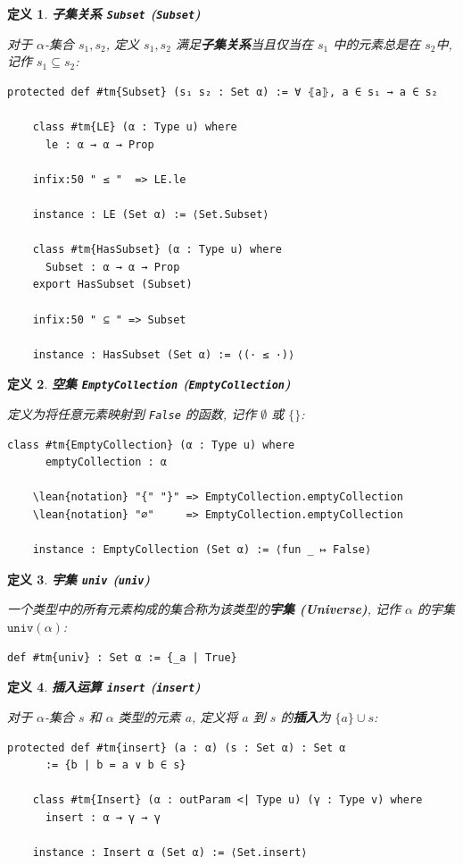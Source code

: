 \documentclass[UTF8]{ctexart}
\DeclareMathOperator{\0}{\mathbf{0}}                    %
\newcommand{\<}{\langle}
\renewcommand{\>}{\rangle}                              %
\newenvironment{dfn_box}{
    \begin{tcolorbox}[enhanced, colback=dfn_green2, boxrule=0pt, frame hidden,
        borderline west={0.7mm}{0.1mm}{dfn_green1},breakable]
    }
    {\end{tcolorbox}}
\theoremstyle{MyStyle} %
\newtheorem{definition}{定义}[subsection]
\newenvironment{dfn}[2]
{
    \begin{dfn_box}
        \begin{definition}
            \textbf{#1
                \ifx\relax#2\relax\else %
                    (#2) %
                \fi}
            \newline
}
{
        \end{definition}
    \end{dfn_box}
}
\newcommand*{\lean}[1]{\texttt{\color{blue}#1}}
\begin{document}
        \begin{dfn}
            {子集关系}
            {\texttt{Subset}}
            对于 $\alpha$-集合 $s_1, s_2$, 定义 $s_1, s_2$ 满足\textbf{子集关系}当且仅当在 $s_1$ 中的元素总是在 $s_2$中, 记作 $s_1\subseteq s_2$:
            \begin{lstlisting}[style=lean]
    protected def #tm{Subset} (s₁ s₂ : Set α) := ∀ ⦃a⦄, a ∈ s₁ → a ∈ s₂

    class #tm{LE} (α : Type u) where
      le : α → α → Prop

    infix:50 " ≤ "  => LE.le

    instance : LE (Set α) := ⟨Set.Subset⟩

    class #tm{HasSubset} (α : Type u) where
      Subset : α → α → Prop
    export HasSubset (Subset)
    
    infix:50 " ⊆ " => Subset

    instance : HasSubset (Set α) := ⟨(· ≤ ·)⟩
            \end{lstlisting}
        \end{dfn}

        \begin{dfn}
            {空集}
            {\texttt{EmptyCollection}}
            定义为将任意元素映射到 \texttt{False} 的函数, 记作 $\emptyset$ 或 $\{\}$: 
            \begin{lstlisting}[style=lean]
    class #tm{EmptyCollection} (α : Type u) where
      emptyCollection : α

    \lean{notation} "{" "}" => EmptyCollection.emptyCollection
    \lean{notation} "∅"     => EmptyCollection.emptyCollection

    instance : EmptyCollection (Set α) := ⟨fun _ ↦ False⟩
            \end{lstlisting}
        \end{dfn}

        \begin{dfn}
            {宇集}
            {\texttt{univ}}
            一个类型中的所有元素构成的集合称为该类型的\textbf{宇集 (Universe)}, 记作 $\alpha$ 的宇集 $\texttt{univ}(\alpha)$: 
            \begin{lstlisting}[style=lean]
    def #tm{univ} : Set α := {_a | True}
            \end{lstlisting}
        \end{dfn}

        \begin{dfn}
            {插入运算}
            {\texttt{insert}}
            对于 $\alpha$-集合 $s$ 和 $\alpha$ 类型的元素 $a$, 定义将 $a$ 到 $s$ 的\textbf{插入}为 $\{a\}\cup s$: 
            \begin{lstlisting}[style=lean]
    protected def #tm{insert} (a : α) (s : Set α) : Set α
      := {b | b = a ∨ b ∈ s}

    class #tm{Insert} (α : outParam <| Type u) (γ : Type v) where
      insert : α → γ → γ

    instance : Insert α (Set α) := ⟨Set.insert⟩
            \end{lstlisting}
        \end{dfn}
\end{document}
